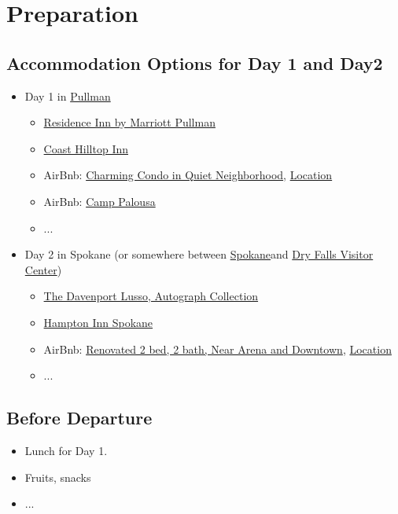 \documentclass{article}
\newcommand{\Pullman}{\href{https://google.com}{Pullman}}
\newcommand{\Spokane}{\href{https://google.com}{Spokane}}
\newcommand{\DryFallsVisitorCenter}{\href{https://maps.app.goo.gl/ikKJMB3SaaTAfcYT9}{Dry Falls Visitor Center}}
\begin{document}
\section{Preparation}
\subsection{Accommodation Options for Day 1 and Day2}

\begin{itemize}
  \item{Day 1 in \Pullman}
  \begin{itemize}
    \item{\href{https://maps.app.goo.gl/EwDjgqSxP142zTK69}{Residence Inn by Marriott Pullman}}
    \item{\href{https://maps.app.goo.gl/W1NdB4NeXamTnb2G7}{Coast Hilltop Inn}}
    \item{AirBnb: \href{https://www.airbnb.com/rooms/38524859?adults=3&check_in=2024-05-18&check_out=2024-05-19}{Charming Condo in Quiet Neighborhood}, \href{https://maps.app.goo.gl/FeBiBENJo8RmT77B7}{Location}}
    \item{AirBnb: \href{https://www.airbnb.com/rooms/959047415867256733?adults=3&check_in=2024-05-18&check_out=2024-05-19}{Camp Palousa}}
    \item{...}
  \end{itemize}
  \item{Day 2 in Spokane (or somewhere between \Spokane and \DryFallsVisitorCenter)}
  \begin{itemize}
    \item{\href{https://maps.app.goo.gl/q4VfxJgmbbmMeNXL6}{The Davenport Lusso, Autograph Collection}}
    \item{\href{https://maps.app.goo.gl/Ca7z3rT2maDN9GnBA}{Hampton Inn Spokane}}
    \item{AirBnb: \href{https://www.airbnb.com/rooms/908205972491427939?adults=3&check_in=2024-05-19&check_out=2024-05-20}{Renovated 2 bed, 2 bath, Near Arena and Downtown}, \href{https://maps.app.goo.gl/YyZHSUGSai8nPxxVA}{Location}}
    \item{...}
  \end{itemize}
\end{itemize}

\subsection{Before Departure}
\begin{itemize}
  \item{Lunch for Day 1.}
  \item{Fruits, snacks}
  \item{...}
\end{itemize}
\end{document}
